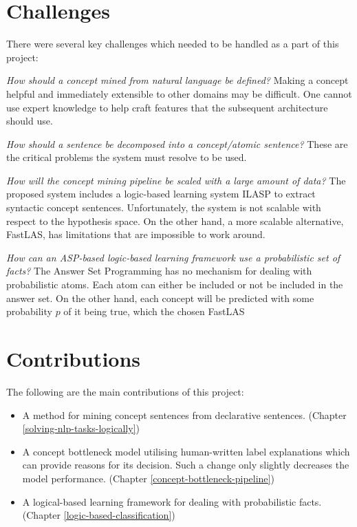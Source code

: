 \section{Challenges}

There were several key challenges which needed to be handled as a part of this project:

\emph{How should a concept mined from natural language be defined?} Making a concept helpful and immediately extensible to other domains may be difficult. One cannot use expert knowledge to help craft features that the subsequent architecture should use.
 
\emph{How should a sentence be decomposed into a concept/atomic sentence?} These are the critical problems the system must resolve to be used.

\emph{How will the concept mining pipeline be scaled with a large amount of data?} The proposed system includes a logic-based learning system ILASP \cite{RefWorks:RefID:18-law2020ilasp} to extract syntactic concept sentences. 
 Unfortunately, the system is not scalable with respect to the hypothesis space. On the other hand, a more scalable alternative, FastLAS, \cite{RefWorks:RefID:19-law2020fastlas:} has limitations that are impossible to work around.
 
\emph{How can an ASP-based logic-based learning framework use a probabilistic set of facts?} The Answer Set Programming has no mechanism for dealing with probabilistic atoms. Each atom can either be included or not be included in the answer set.
On the other hand, each concept will be predicted with some probability $p$ of it being true, which the chosen FastLAS

\section{Contributions}

The following are the main contributions of this project:

\begin{itemize}
    \item A method for mining concept sentences from declarative sentences. (Chapter \ref{solving-nlp-tasks-logically})
    
    \item A concept bottleneck model utilising human-written label explanations which can provide reasons for its decision. Such a change only slightly decreases the model performance. (Chapter \ref{concept-bottleneck-pipeline})
    
    \item A logical-based learning framework for dealing with probabilistic facts. (Chapter \ref{logic-based-classification})
\end{itemize}


